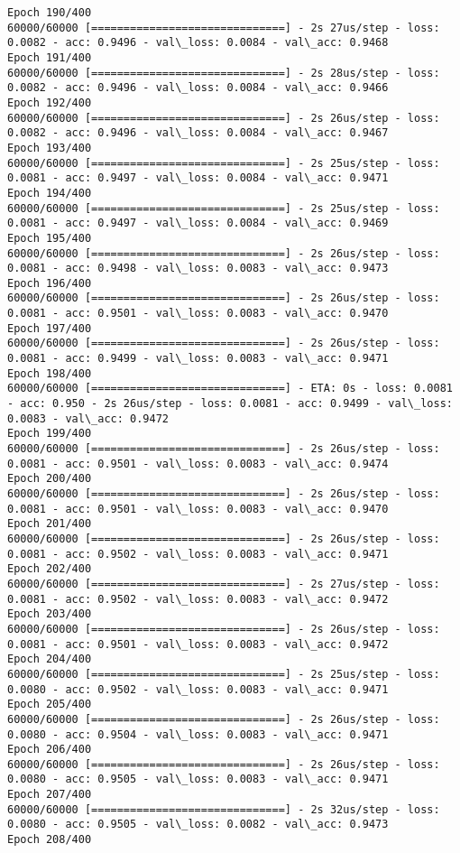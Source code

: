 \documentclass[11pt]{article}
\begin{document}
\begin{Verbatim}[commandchars=\\\{\}]
Epoch 190/400
60000/60000 [==============================] - 2s 27us/step - loss: 0.0082 - acc: 0.9496 - val\_loss: 0.0084 - val\_acc: 0.9468
Epoch 191/400
60000/60000 [==============================] - 2s 28us/step - loss: 0.0082 - acc: 0.9496 - val\_loss: 0.0084 - val\_acc: 0.9466
Epoch 192/400
60000/60000 [==============================] - 2s 26us/step - loss: 0.0082 - acc: 0.9496 - val\_loss: 0.0084 - val\_acc: 0.9467
Epoch 193/400
60000/60000 [==============================] - 2s 25us/step - loss: 0.0081 - acc: 0.9497 - val\_loss: 0.0084 - val\_acc: 0.9471
Epoch 194/400
60000/60000 [==============================] - 2s 25us/step - loss: 0.0081 - acc: 0.9497 - val\_loss: 0.0084 - val\_acc: 0.9469
Epoch 195/400
60000/60000 [==============================] - 2s 26us/step - loss: 0.0081 - acc: 0.9498 - val\_loss: 0.0083 - val\_acc: 0.9473
Epoch 196/400
60000/60000 [==============================] - 2s 26us/step - loss: 0.0081 - acc: 0.9501 - val\_loss: 0.0083 - val\_acc: 0.9470
Epoch 197/400
60000/60000 [==============================] - 2s 26us/step - loss: 0.0081 - acc: 0.9499 - val\_loss: 0.0083 - val\_acc: 0.9471
Epoch 198/400
60000/60000 [==============================] - ETA: 0s - loss: 0.0081 - acc: 0.950 - 2s 26us/step - loss: 0.0081 - acc: 0.9499 - val\_loss: 0.0083 - val\_acc: 0.9472
Epoch 199/400
60000/60000 [==============================] - 2s 26us/step - loss: 0.0081 - acc: 0.9501 - val\_loss: 0.0083 - val\_acc: 0.9474
Epoch 200/400
60000/60000 [==============================] - 2s 26us/step - loss: 0.0081 - acc: 0.9501 - val\_loss: 0.0083 - val\_acc: 0.9470
Epoch 201/400
60000/60000 [==============================] - 2s 26us/step - loss: 0.0081 - acc: 0.9502 - val\_loss: 0.0083 - val\_acc: 0.9471
Epoch 202/400
60000/60000 [==============================] - 2s 27us/step - loss: 0.0081 - acc: 0.9502 - val\_loss: 0.0083 - val\_acc: 0.9472
Epoch 203/400
60000/60000 [==============================] - 2s 26us/step - loss: 0.0081 - acc: 0.9501 - val\_loss: 0.0083 - val\_acc: 0.9472
Epoch 204/400
60000/60000 [==============================] - 2s 25us/step - loss: 0.0080 - acc: 0.9502 - val\_loss: 0.0083 - val\_acc: 0.9471
Epoch 205/400
60000/60000 [==============================] - 2s 26us/step - loss: 0.0080 - acc: 0.9504 - val\_loss: 0.0083 - val\_acc: 0.9471
Epoch 206/400
60000/60000 [==============================] - 2s 26us/step - loss: 0.0080 - acc: 0.9505 - val\_loss: 0.0083 - val\_acc: 0.9471
Epoch 207/400
60000/60000 [==============================] - 2s 32us/step - loss: 0.0080 - acc: 0.9505 - val\_loss: 0.0082 - val\_acc: 0.9473
Epoch 208/400

\end{Verbatim}
\end{document}
